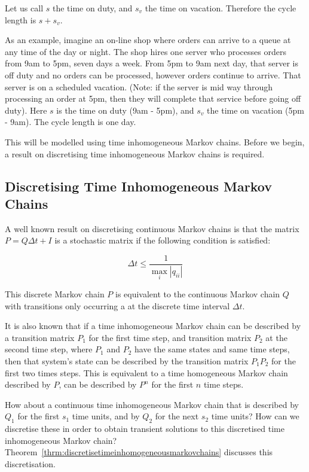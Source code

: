 \documentclass{article}
\begin{document}
Let us call $s$ the time on duty, and $s_v$ the time on vacation. Therefore the cycle length is $s + s_v$.

As an example, imagine an on-line shop where orders can arrive to a queue at any
time of the day or night. The shop hires one server who processes orders from
9am to 5pm, seven days a week. From 5pm to 9am next day, that server is off duty
and no orders can be processed, however orders continue to arrive. That server
is on a scheduled vacation. (Note: if the server is mid way through processing
an order at 5pm, then they will complete that service before going off duty). Here $s$ is the time on duty (9am - 5pm), and $s_v$ the time on vacation (5pm - 9am). The cycle length is one day.

This will be modelled using time inhomogeneous Markov chains. Before we begin, a result on discretising time inhomogeneous Markov chains is required.

\subsection{Discretising Time Inhomogeneous Markov Chains}

A well known result \cite{stewart09} on discretising continuous Markov chains is that the matrix $P = Q \Delta t + I$ is a stochastic matrix if the following condition is satisfied:

\begin{equation}
\Delta t \leq \frac{1}{\max_i |q_{ii}|}
\end{equation}

This discrete Markov chain $P$ is equivalent to the continuous Markov chain $Q$ with transitions only occurring a at the discrete time interval $\Delta t$.

It is also known that if a time inhomogeneous Markov chain can be described by a transition matrix $P_1$ for the first time step, and transition matrix $P_2$ at the second time step, where $P_1$ and $P_2$ have the same states and same time steps, then that system's state can be described by the transition matrix $P_1 P_2$ for the first two times steps. This is equivalent to a time homogeneous Markov chain described by $P$, can be described by $P^n$ for the first $n$ time steps.

How about a continuous time inhomogeneous Markov chain that is described by $Q_1$ for the first $s_1$ time units, and by $Q_2$ for the next $s_2$ time units? How can we discretise these in order to obtain transient solutions to this discretised time inhomogeneous Markov chain? Theorem~\ref{thrm:discretisetimeinhomogeneousmarkovchains} discusses this discretisation.
\newline
\end{document}
